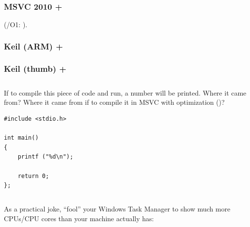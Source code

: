\subsubsection{MSVC 2010 + }

(/O1: ).



\subsubsection{Keil (ARM) + \Othree}



\subsubsection{Keil (thumb) + \Othree}



\subsection{}

{If to compile this piece of code and run, a number will be printed. Where it came from?
Where it came from if to compile it in MSVC with optimization (\Ox)?}

\begin{lstlisting}
#include <stdio.h>

int main()
{
	printf ("%d\n");

	return 0;
};
\end{lstlisting}

\subsection{}

{As a practical joke, ``fool'' your Windows Task Manager 
to show much more CPUs/CPU cores than your machine actually has}:

